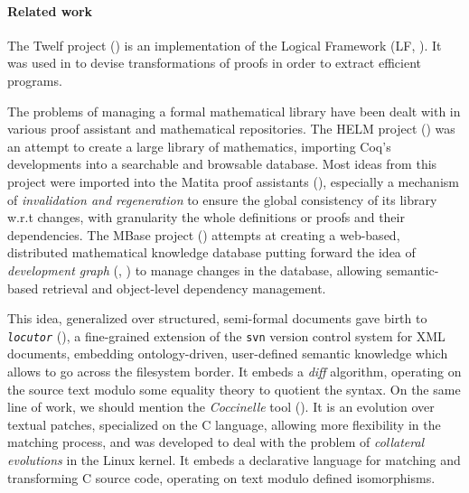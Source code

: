 \documentclass{article}
\begin{document}


\paragraph{Related work}
\label{rw}

The \textsf{Twelf} project (\cite{pfenning1999system}) is an
implementation of the Logical Framework (LF,
\cite{harper1993framework}). It was used in \cite{anderson1993program}
to devise transformations of proofs in order to extract efficient
programs.

The problems of managing a formal mathematical library have been dealt
with in various proof assistant and mathematical repositories. The
HELM project (\cite{asperti2006content})
was an attempt to create a large library of mathematics, importing
\textsf{Coq}'s developments into a searchable and browsable database.
Most ideas from this project were imported into the \textsf{Matita}
proof assistants (\cite{AspertiCTZ07}), especially a mechanism of
\emph{invalidation and regeneration} to ensure the global consistency
of its library w.r.t changes, with granularity the whole definitions
or proofs and their dependencies. The MBase project
(\cite{kohlhase2001mbase}) attempts at creating a web-based,
distributed mathematical knowledge database putting forward the idea
of \emph{development graph} (\cite{hutter2000management},
\cite{autexier2000towards}) to manage changes in the database,
allowing semantic-based retrieval and object-level dependency
management.

This idea, generalized over structured, semi-formal documents gave
birth to \texttt{\it locutor} (\cite{muller2008fine}), a fine-grained
extension of the \texttt{svn} version control system for XML
documents, embedding ontology-driven, user-defined semantic knowledge
which allows to go across the filesystem border. It embeds a
\emph{diff} algorithm, operating on the source text modulo some
equality theory to quotient the syntax. On the same line of work, we
should mention the \emph{Coccinelle} tool
(\cite{padioleau2008documenting}). It is an evolution over textual
patches, specialized on the C language, allowing more flexibility in
the matching process, and was developed to deal with the problem of
\emph{collateral evolutions} in the Linux kernel. It embeds a
declarative language for matching and transforming C source code,
operating on text modulo defined isomorphisms.
\end{document}

